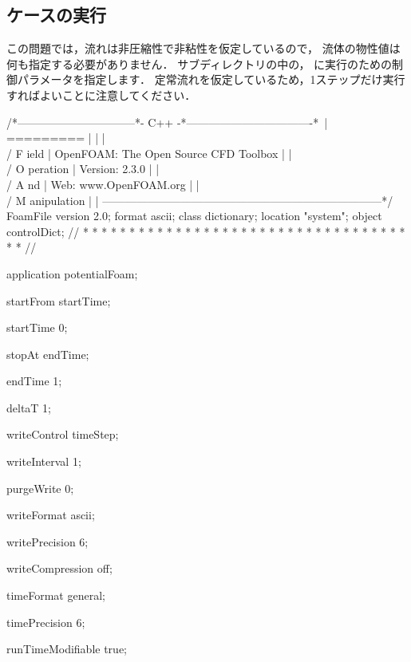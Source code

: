 \subsection{ケースの実行}
\label{ssec:3.1.5}
この問題では，流れは非圧縮性で非粘性を仮定しているので，
流体の物性値は何も指定する必要がありません．
%
%
サブディレクトリの中の，
に実行のための制御パラメータを指定します．
定常流れを仮定しているため，1ステップだけ実行すればよいことに注意してください．
\begin{OFverbatim}
/*--------------------------------*- C++ -*----------------------------------*\
| =========                 |                                                 |
| \\      /  F ield         | OpenFOAM: The Open Source CFD Toolbox           |
|  \\    /   O peration     | Version:  2.3.0                                 |
|   \\  /    A nd           | Web:      www.OpenFOAM.org                      |
|    \\/     M anipulation  |                                                 |
\*---------------------------------------------------------------------------*/
FoamFile
{
    version     2.0;
    format      ascii;
    class       dictionary;
    location    "system";
    object      controlDict;
}
// * * * * * * * * * * * * * * * * * * * * * * * * * * * * * * * * * * * * * //

application     potentialFoam;

startFrom       startTime;

startTime       0;

stopAt          endTime;

endTime         1;

deltaT          1;

writeControl    timeStep;

writeInterval   1;

purgeWrite      0;

writeFormat     ascii;

writePrecision  6;

writeCompression off;

timeFormat      general;

timePrecision   6;

runTimeModifiable true;


\end{OFverbatim}
